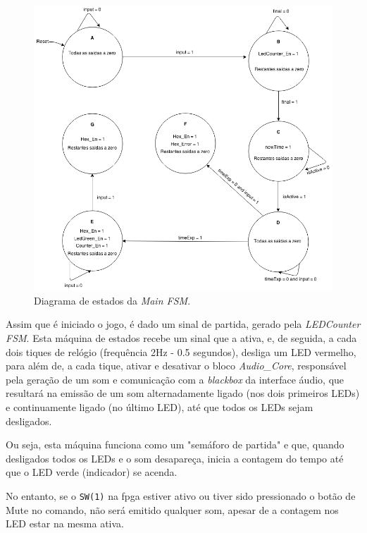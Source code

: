 \documentclass[a4paper,11pt,onecolumn]{report}
\begin{document}
\begin{figure}[h]
\centerline{\includegraphics[scale=0.4]{Images/MainFSMDiagram}}
\caption{Diagrama de estados da \textit{Main FSM}.}
\label{figmainfsm}
\end{figure}

\pagebreak

Assim que é iniciado o jogo, é dado um sinal de partida, gerado pela \textit{LEDCounter FSM}. Esta máquina de estados recebe um sinal que a ativa, e, de seguida, a cada dois tiques de relógio (frequência 2Hz - 0.5 segundos), desliga um LED vermelho, para além de, a cada tique, ativar e desativar o bloco \textit{Audio_Core}, responsável pela geração de um som e comunicação com a \textit{blackbox} da interface áudio, que resultará na emissão de um som alternadamente ligado (nos dois primeiros LEDs) e continuamente ligado (no último LED), até que todos os LEDs sejam desligados.

Ou seja, esta máquina funciona como um "semáforo de partida" e que, quando desligados todos os LEDs e o som desapareça, inicia a contagem do tempo até que o LED verde (indicador) se acenda.

No entanto, se o \texttt{SW(1)} na \ac{fpga} estiver ativo ou tiver sido pressionado o botão de Mute no comando, não será emitido qualquer som, apesar de a contagem nos LED estar na mesma ativa.
\end{document}
